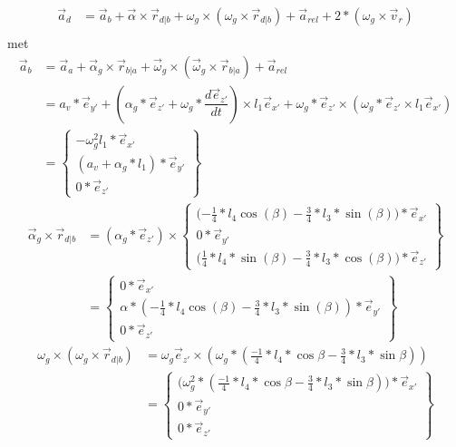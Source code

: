 \documentclass[a4paper,10pt]{article}
\begin{document}
\begin{equation}
	\begin{aligned}
		\vec{a}_d &= \vec{a}_b + \vec{\alpha} \times  \vec{r}_{d|b} + \omega_g \times (\omega_g \times \vec{r}_{d|b}) + \vec{a}_{rel} + 2* (\omega_g \times \vec{v}_r)\\
	\end{aligned}
\end{equation}
met\\
\begin{equation}
\begin{aligned}
\vec{a}_b &= \vec{a}_a + \vec{\alpha}_g  \times \vec{r}_{b|a} + \vec{\omega}_g \times (\vec{\omega}_g \times \vec{r}_{b|a}) + \vec{a}_{rel}\\
&= a_v * \vec{e}_{y'} + (\alpha_g * \vec{e}_{z'} + \omega_g *\dfrac{d\vec{e}_{z'}}{dt}) \times l_1 \vec{e}_{x'} + \omega_{g} *\vec{e}_{z'} \times (\omega_{g} *\vec{e}_{z'}  \times l_1 \vec{e}_{x'})\\
& = \begin{Bmatrix}
-\omega^{2}_g l_1 * \vec{e}_{x'}\\
(a_v + \alpha_g * l_1)*\vec{e}_{y'}\\
0 * \vec{e}_{z'}
\end{Bmatrix}
\end{aligned}
\end{equation}
\begin{equation}
\begin{aligned}
	\vec{\alpha}_g \times \vec{r}_{d|b}  &= (\alpha_g * \vec{e}_{z'}) \times \begin{Bmatrix}
	\Big({-\frac{1}{4}} * l_4 \cos(\beta)-\frac{3}{4}*l_3*\sin(\beta)\Big)*\vec{e}_{x'}\\
	0 * \vec{e}_{y'}\\
	\Big (\frac{1}{4}*l_4 *\sin(\beta) - \frac{3}{4}*l_3*\cos(\beta)\Big) * \vec{e}_{z'}
	\end{Bmatrix}\\
	&= \begin{Bmatrix}
	0*\vec{e}_{x'}\\
	\alpha *({-\frac{1}{4}} * l_4 \cos(\beta)-\frac{3}{4}*l_3*\sin(\beta))*\vec{e}_{y'}\\
	0*\vec{e}_{z'}
	\end{Bmatrix}
\end{aligned}
\end{equation}
\begin{equation}
	\begin{aligned}
	\omega_g \times (\omega_g \times \vec{r}_{d|b}) &= \omega_g \vec{e}_{z'} \times (\omega_g*(\frac{-1}{4}*l_4*\cos{\beta}-\frac{3}{4}*l_3*\sin{\beta}))\\
	& = \begin{Bmatrix}
	\Big(\omega_{g}^{2} * (\frac{-1}{4}*l_4*\cos{\beta}-\frac{3}{4}*l_3*\sin{\beta})\Big) * \vec{e}_{x'}\\
	0*\vec{e}_{y'}\\
	0*\vec{e}_{z'}
	\end{Bmatrix}
	\end{aligned}
\end{equation}\\
\end{document}
